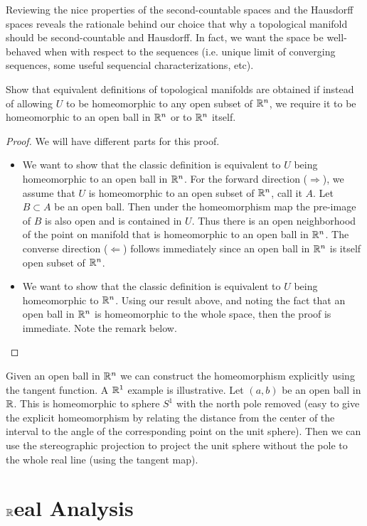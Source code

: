Reviewing the nice properties of the second-countable spaces and the Hausdorff spaces reveals the rationale behind our choice that why a topological manifold should be second-countable and Hausdorff. In fact, we want the space be well-behaved when with respect to the sequences (i.e. unique limit of converging sequences, some useful sequencial characterizations, etc).


\begin{problem}
	Show that equivalent definitions of topological manifolds are obtained if instead of allowing $ U $ to be homeomorphic to any open subset of $ \mathbb{R}^n $, we require it to be homeomorphic to an open ball in $ \mathbb{R}^n $ or to $ \mathbb{R}^n $ itself.
\end{problem}
\begin{proof}
	We will have different parts for this proof.
	\begin{itemize}
		\item We want to show that the classic definition is equivalent to $ U $ being homeomorphic to an open ball in $ \mathbb{R}^n $. For the forward direction ($ \boxed{\Longrightarrow} $), we assume that $ U $ is homeomorphic to an open subset of $ \mathbb{R}^n $, call it $ A $. Let $ B \subset A $ be an open ball. Then under the homeomorphism map the pre-image of $ B $ is also open and is contained in $ U $. Thus there is an open neighborhood of the point on manifold that is homeomorphic to an open ball in $ \mathbb{R}^n $. The converse direction ($ \boxed{\Longleftarrow} $) follows immediately since an open ball in $ \mathbb{R}^n $ is itself open subset of $ \mathbb{R}^n $.
		
		\item We want to show that the classic definition is equivalent to $ U $ being homeomorphic to $ \mathbb{R}^n $. Using our result above, and noting the fact that an open ball in $ \mathbb{R}^n $ is homeomorphic to the whole space, then the proof is immediate. Note the remark below.
	\end{itemize}
\end{proof}
\begin{remark}
	Given an open ball in $ \mathbb{R}^n $ we can construct the homeomorphism explicitly using the tangent function. A $ \mathbb{R}^1 $ example is illustrative. Let $ (a,b) $ be an open ball in $ \mathbb{R} $. This is homeomorphic to sphere $ S^1 $ with the north pole removed (easy to give the explicit homeomorphism by relating the distance from the center of the interval to the angle of the corresponding point on the unit sphere). Then we can use the stereographic projection to project the unit sphere without the pole to the whole real line (using the tangent map).
\end{remark}








\chapter{$\mathbb{R}$eal Analysis}




